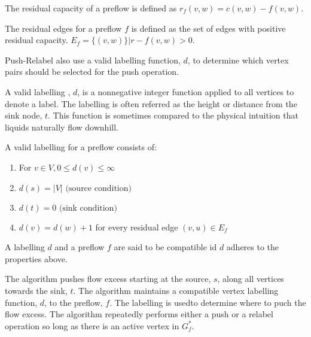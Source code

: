 \begin{definition}
	The residual capacity of a preflow is defined as $r_f(v,w) = c(v,w)-f(v,w)$.
\end{definition}

\begin{definition}
	The residual edges for a preflow $f$ is defined as the set of edges with positive residual capacity. $E_f = \{(v,w)\} | r-f(v,w) > 0$.
\end{definition}

\begin{definition}[Labelling]
	Push-Relabel also use a valid labelling function, $d$, to determine which vertex pairs should be selected for the push operation.
	
	A valid labelling , $d$, is a nonnegative integer function applied to all vertices to denote a label. The labelling is often referred as the height or distance from the sink node, $t$. This function is sometimes compared to the physical intuition that liquids naturally flow downhill.
	
	A valid labelling for a preflow consists of:
	\begin{enumerate}
		\item For $v \in V, 0 \leq d(v) \leq \infty$
		\item $d(s) = |V| \text{ (source condition)}$
		\item $d(t) = 0 \text{ (sink condition)}$
		\item $d(v) = d(w) + 1$ for every residual edge $(v,u) \in E_f$
	\end{enumerate}
	A labelling $d$ and a preflow $f$ are said to be compatible id $d$ adheres to the properties above.
	
	The algorithm pushes flow excess starting at the source, $s$, along all vertices towards the sink, $t$. The algorithm maintains a compatible vertex labelling function, $d$, to the preflow, $f$. The labelling is usedto determine where to puch the flow excess. The algorithm repeatedly performs either a push or a relabel operation so long as there is an active vertex in $G^*_f$.
\end{definition}

